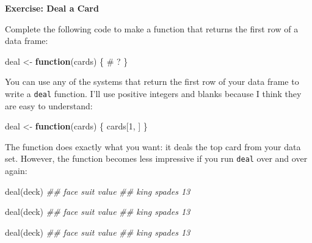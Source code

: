\documentclass[
  letterpaper,
  DIV=11,
  numbers=noendperiod]{scrbook}
\newenvironment{Shaded}{\begin{snugshade}}{\end{snugshade}}
\newcommand{\CommentTok}[1]{\textcolor[rgb]{0.37,0.37,0.37}{#1}}
\newcommand{\ControlFlowTok}[1]{\textcolor[rgb]{0.00,0.23,0.31}{\textbf{#1}}}
\newcommand{\DecValTok}[1]{\textcolor[rgb]{0.68,0.00,0.00}{#1}}
\newcommand{\DocumentationTok}[1]{\textcolor[rgb]{0.37,0.37,0.37}{\textit{#1}}}
\newcommand{\FunctionTok}[1]{\textcolor[rgb]{0.28,0.35,0.67}{#1}}
\newcommand{\NormalTok}[1]{\textcolor[rgb]{0.00,0.23,0.31}{#1}}
\newcommand{\OtherTok}[1]{\textcolor[rgb]{0.00,0.23,0.31}{#1}}
\begin{document}
\begin{tcolorbox}[enhanced jigsaw, left=2mm, breakable, colback=white, colframe=quarto-callout-color-frame, leftrule=.75mm, bottomrule=.15mm, arc=.35mm, opacityback=0, rightrule=.15mm, toprule=.15mm]

\vspace{-3mm}\textbf{Exercise: Deal a Card}\vspace{3mm}

Complete the following code to make a function that returns the first
row of a data frame:

\begin{Shaded}
\begin{Highlighting}[]
\NormalTok{deal }\OtherTok{\textless{}{-}} \ControlFlowTok{function}\NormalTok{(cards) \{}
   \CommentTok{\# ?}
\NormalTok{\}}
\end{Highlighting}
\end{Shaded}

\end{tcolorbox}

You can use any of the systems that return the first row of your data
frame to write a \texttt{deal} function. I'll use positive integers and
blanks because I think they are easy to understand:

\begin{Shaded}
\begin{Highlighting}[]
\NormalTok{deal }\OtherTok{\textless{}{-}} \ControlFlowTok{function}\NormalTok{(cards) \{}
\NormalTok{  cards[}\DecValTok{1}\NormalTok{, ]}
\NormalTok{\}}
\end{Highlighting}
\end{Shaded}

The function does exactly what you want: it deals the top card from your
data set. However, the function becomes less impressive if you run
\texttt{deal} over and over again:

\begin{Shaded}
\begin{Highlighting}[]
\FunctionTok{deal}\NormalTok{(deck)}
\DocumentationTok{\#\# face   suit value}
\DocumentationTok{\#\# king spades    13}

\FunctionTok{deal}\NormalTok{(deck)}
\DocumentationTok{\#\# face   suit value}
\DocumentationTok{\#\# king spades    13}

\FunctionTok{deal}\NormalTok{(deck)}
\DocumentationTok{\#\# face   suit value}
\DocumentationTok{\#\# king spades    13}
\end{Highlighting}
\end{Shaded}
\end{document}
